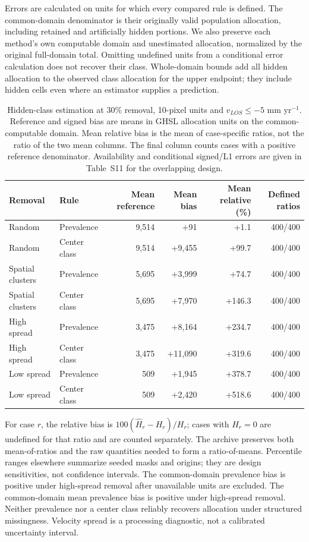 \documentclass[10pt,a4paper]{article}
\begin{document}
Errors are calculated on units for which every compared rule is defined. The common-domain denominator is their originally valid population allocation, including retained and artificially hidden portions. We also preserve each method's own computable domain and unestimated allocation, normalized by the original full-domain total. Omitting undefined units from a conditional error calculation does not recover their class. Whole-domain bounds add all hidden allocation to the observed class allocation for the upper endpoint; they include hidden cells even where an estimator supplies a prediction.

\begin{table}[htbp]\centering\small
\caption{Hidden-class estimation at 30\% removal, 10-pixel units and $v_{LOS}\leq-5$ mm yr$^{-1}$. Reference and signed bias are means in GHSL allocation units on the common-computable domain. Mean relative bias is the mean of case-specific ratios, not the ratio of the two mean columns. The final column counts cases with a positive reference denominator. Availability and conditional signed/L1 errors are given in Table~S11 for the overlapping design.}
\begin{tabular}{llrrrr}\toprule
Removal & Rule & Mean reference & Mean bias & Mean relative (\%) & Defined ratios\\\midrule
Random & Prevalence & 9,514 & +91 & +1.1 & 400/400 \\
Random & Center class & 9,514 & +9,455 & +99.7 & 400/400 \\
Spatial clusters & Prevalence & 5,695 & +3,999 & +74.7 & 400/400 \\
Spatial clusters & Center class & 5,695 & +7,970 & +146.3 & 400/400 \\
High spread & Prevalence & 3,475 & +8,164 & +234.7 & 400/400 \\
High spread & Center class & 3,475 & +11,090 & +319.6 & 400/400 \\
Low spread & Prevalence & 509 & +1,945 & +378.7 & 400/400 \\
Low spread & Center class & 509 & +2,420 & +518.6 & 400/400 \\
\bottomrule\end{tabular}\end{table}

For case $r$, the relative bias is $100(\widehat H_r-H_r)/H_r$; cases with $H_r=0$ are undefined for that ratio and are counted separately. The archive preserves both mean-of-ratios and the raw quantities needed to form a ratio-of-means. Percentile ranges elsewhere summarize seeded masks and origins; they are design sensitivities, not confidence intervals. The common-domain prevalence bias is positive under high-spread removal after unavailable units are excluded. The common-domain mean prevalence bias is positive under high-spread removal. Neither prevalence nor a center class reliably recovers allocation under structured missingness. Velocity spread is a processing diagnostic, not a calibrated uncertainty interval.
\end{document}

